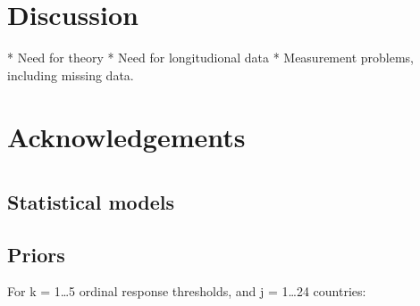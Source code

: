 \documentclass[man]{article}%
\begin{document}

\section{Discussion}

* Need for theory
* Need for longitudional data
* Measurement problems, including missing data. 

\section{Acknowledgements}
\label{app:instrument}




\appendix


\section{}

\subsection{Statistical models}

\subsection{Priors}
\noindent For k = 1\dots 5 ordinal response thresholds, and j = 1\dots 24 countries:
\end{document}

